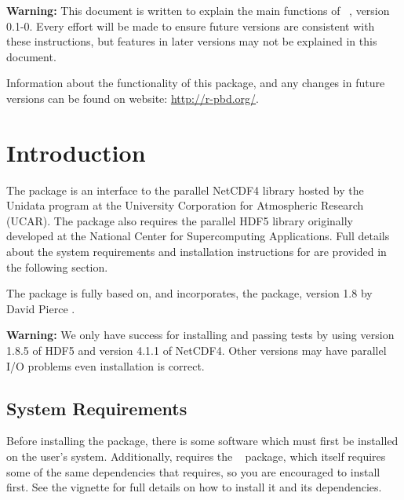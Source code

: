 {\color{red} \bf Warning:} This document is written to explain the main
functions of ~\citep{Ostrouchov2012pbdNCDF4package},
version 0.1-0.
Every effort will be made to ensure future versions are consistent with
these instructions, but features in later versions may not be explained
in this document.

Information about the functionality of this package,
and any changes in future versions can be found on website:
\url{http://r-pbd.org/}.

\section{Introduction}
\label{sec:quick_start}

The  package is an interface to the parallel NetCDF4 library \citep{netcdf} hosted by the Unidata program at the University Corporation for Atmospheric Research (UCAR). The package also requires the parallel HDF5 library \citep{hdf5} originally developed at the National Center for Supercomputing Applications. Full details about the system requirements and installation instructions for  are provided in the following section.

The  package is fully based on, and incorporates, the  package, version 1.8 by David Pierce \citep{ncdf4}.  

{\color{red} \bf Warning:}
We only have success for installing and passing tests by using version 1.8.5 of HDF5 and version 4.1.1 of NetCDF4.  Other versions may have parallel I/O problems even installation is correct.


\subsection[System Requirements]{System Requirements}
\label{sec:system_requirements}

Before installing the  package, there is some software which must first be installed on the user's system.  Additionally,  requires the ~\citep{Chen2012pbdMPIpackage} package, which itself requires some of the same dependencies that  requires, so you are encouraged to install  first.  See the  vignette \citep{Chen2012pbdMPIvignette} for full details on how to install it and its dependencies.


